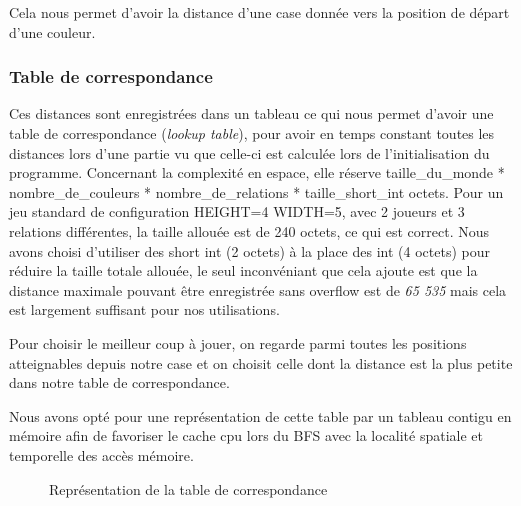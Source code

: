 Cela nous permet d'avoir la distance d'une case donnée vers la position de départ d'une couleur.
\subsubsection{Table de correspondance}

Ces distances sont enregistrées dans un tableau ce qui nous permet d'avoir une table de correspondance (\emph{lookup table}),
pour avoir en temps constant toutes les distances lors d'une partie vu que celle-ci est calculée lors de l'initialisation
du programme. Concernant la complexité en espace, elle réserve 
taille\_du\_monde * nombre\_de\_couleurs * nombre\_de\_relations * taille\_short\_int octets. Pour un jeu standard de configuration
 HEIGHT=4 WIDTH=5, avec 2 joueurs et 3 relations différentes, la taille allouée est de 240 octets, ce qui est correct.
Nous avons choisi d'utiliser des short int (2 octets) à la place des int (4 octets) pour réduire la taille totale allouée,
le seul inconvéniant que cela ajoute est que la distance maximale pouvant être enregistrée sans overflow est de \emph{65 535} mais cela
est largement suffisant pour nos utilisations.

Pour choisir le meilleur coup à jouer, on regarde parmi toutes les positions atteignables depuis 
notre case et on choisit celle dont la distance est la plus petite dans notre table de correspondance.

Nous avons opté pour une représentation de cette table par un tableau contigu en mémoire afin de favoriser le cache cpu
lors du BFS avec la localité spatiale et temporelle des accès mémoire. 

\begin{figure}[H]
\centering
{}
\caption{Représentation de la table de correspondance}
\end{figure}


